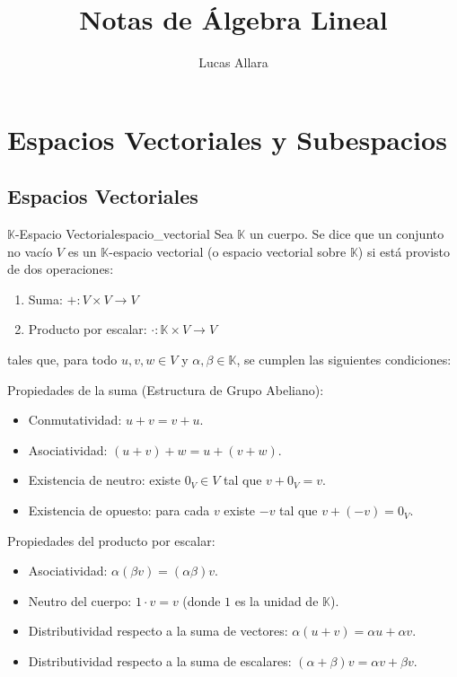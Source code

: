 \documentclass[11pt, a4paper]{article}
\title{\textbf{Notas de Álgebra Lineal}}
\author{Lucas Allara}
\date{}
\begin{document}
\maketitle
\newpage

\tableofcontents
\newpage

\section{Espacios Vectoriales y Subespacios}

\subsection{Espacios Vectoriales}

\begin{definicion}{$\mathbb{K}$-Espacio Vectorial}{espacio_vectorial}
Sea $\mathbb{K}$ un cuerpo. Se dice que un conjunto no vacío $V$ es un $\mathbb{K}$-espacio vectorial (o espacio vectorial sobre $\mathbb{K}$) si está provisto de dos operaciones:
\begin{enumerate}
    \item[i)] Suma: $+: V \times V \to V$
    \item[ii)] Producto por escalar: $\cdot: \mathbb{K} \times V \to V$
\end{enumerate}
tales que, para todo $u, v, w \in V$ y $\alpha, \beta \in \mathbb{K}$, se cumplen las siguientes condiciones:

Propiedades de la suma (Estructura de Grupo Abeliano):
\begin{itemize}
    \item Conmutatividad: $u+v = v+u$.
    \item Asociatividad: $(u+v)+w = u+(v+w)$.
    \item Existencia de neutro: existe $0_V \in V$ tal que $v + 0_V = v$.
    \item Existencia de opuesto: para cada $v$ existe $-v$ tal que $v + (-v) = 0_V$.
\end{itemize}

Propiedades del producto por escalar:
\begin{itemize}
    \item Asociatividad: $\alpha(\beta v) = (\alpha\beta)v$.
    \item Neutro del cuerpo: $1 \cdot v = v$ (donde $1$ es la unidad de $\mathbb{K}$).
    \item Distributividad respecto a la suma de vectores: $\alpha(u+v) = \alpha u + \alpha v$.
    \item Distributividad respecto a la suma de escalares: $(\alpha+\beta)v = \alpha v + \beta v$.
\end{itemize}
\end{definicion}
\end{document}
